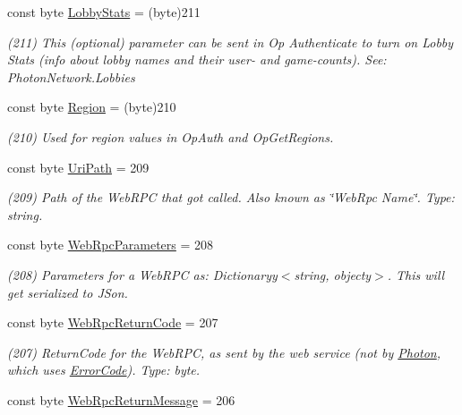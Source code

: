 \begin{DoxyCompactItemize}
const byte \hyperlink{class_exit_games_1_1_client_1_1_photon_1_1_parameter_code_aabb8a502fb565bc4cbdfd48a23b4e7bc}{Lobby\+Stats} = (byte)211
\begin{DoxyCompactList}\small\item\em (211) This (optional) parameter can be sent in Op Authenticate to turn on Lobby Stats (info about lobby names and their user-\/ and game-\/counts). See\+: Photon\+Network.\+Lobbies\end{DoxyCompactList}\item 
const byte \hyperlink{class_exit_games_1_1_client_1_1_photon_1_1_parameter_code_a7349c22fccf111d81e61d6fc37239939}{Region} = (byte)210
\begin{DoxyCompactList}\small\item\em (210) Used for region values in Op\+Auth and Op\+Get\+Regions.\end{DoxyCompactList}\item 
const byte \hyperlink{class_exit_games_1_1_client_1_1_photon_1_1_parameter_code_a2283a31554fd7e99130958b622aabb8e}{Uri\+Path} = 209
\begin{DoxyCompactList}\small\item\em (209) Path of the Web\+R\+PC that got called. Also known as \char`\"{}\+Web\+Rpc Name\char`\"{}. Type\+: string.\end{DoxyCompactList}\item 
const byte \hyperlink{class_exit_games_1_1_client_1_1_photon_1_1_parameter_code_a878eff4bd7eff73e35a277b64efe5d21}{Web\+Rpc\+Parameters} = 208
\begin{DoxyCompactList}\small\item\em (208) Parameters for a Web\+R\+PC as\+: Dictionaryy$<$string, objecty$>$. This will get serialized to J\+Son.\end{DoxyCompactList}\item 
const byte \hyperlink{class_exit_games_1_1_client_1_1_photon_1_1_parameter_code_afee06b263ad9c6f084efb578b4e29bd5}{Web\+Rpc\+Return\+Code} = 207
\begin{DoxyCompactList}\small\item\em (207) Return\+Code for the Web\+R\+PC, as sent by the web service (not by \hyperlink{namespace_exit_games_1_1_client_1_1_photon}{Photon}, which uses \hyperlink{class_exit_games_1_1_client_1_1_photon_1_1_error_code}{Error\+Code}). Type\+: byte.\end{DoxyCompactList}\item 
const byte \hyperlink{class_exit_games_1_1_client_1_1_photon_1_1_parameter_code_acb800c4d8182c1f318eac4fe788cd9f6}{Web\+Rpc\+Return\+Message} = 206

\end{DoxyCompactItemize}
